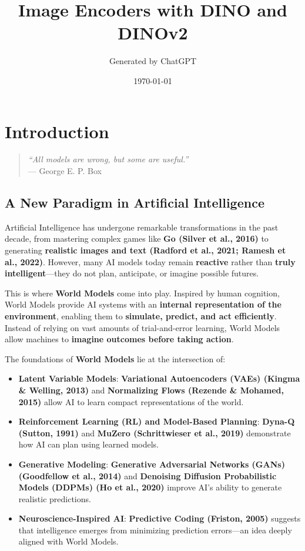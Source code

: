 \documentclass[
]{book}
\title{\textbf{Image Encoders with DINO and DINOv2}}
\author{Generated by ChatGPT}
\date{1970-01-01}
\providecommand{\tightlist}{%
  \setlength{\itemsep}{0pt}\setlength{\parskip}{0pt}}
\begin{document}
\maketitle

{
\setcounter{tocdepth}{1}
\tableofcontents
}
\chapter{Introduction}\label{introduction}

\begin{quote}
\emph{``All models are wrong, but some are useful.''}\\
--- George E. P. Box
\end{quote}

\section{A New Paradigm in Artificial Intelligence}\label{a-new-paradigm-in-artificial-intelligence}

Artificial Intelligence has undergone remarkable transformations in the past decade, from mastering complex games like \textbf{Go (Silver et al., 2016)} to generating \textbf{realistic images and text (Radford et al., 2021; Ramesh et al., 2022)}. However, many AI models today remain \textbf{reactive} rather than \textbf{truly intelligent}---they do not plan, anticipate, or imagine possible futures.

This is where \textbf{World Models} come into play. Inspired by human cognition, World Models provide AI systems with an \textbf{internal representation of the environment}, enabling them to \textbf{simulate, predict, and act efficiently}. Instead of relying on vast amounts of trial-and-error learning, World Models allow machines to \textbf{imagine outcomes before taking action}.

The foundations of \textbf{World Models} lie at the intersection of:

\begin{itemize}
\tightlist
\item
  \textbf{Latent Variable Models}: \textbf{Variational Autoencoders (VAEs) (Kingma \& Welling, 2013)} and \textbf{Normalizing Flows (Rezende \& Mohamed, 2015)} allow AI to learn compact representations of the world.\\
\item
  \textbf{Reinforcement Learning (RL) and Model-Based Planning}: \textbf{Dyna-Q (Sutton, 1991)} and \textbf{MuZero (Schrittwieser et al., 2019)} demonstrate how AI can plan using learned models.\\
\item
  \textbf{Generative Modeling}: \textbf{Generative Adversarial Networks (GANs) (Goodfellow et al., 2014)} and \textbf{Denoising Diffusion Probabilistic Models (DDPMs) (Ho et al., 2020)} improve AI's ability to generate realistic predictions.\\
\item
  \textbf{Neuroscience-Inspired AI}: \textbf{Predictive Coding (Friston, 2005)} suggests that intelligence emerges from minimizing prediction errors---an idea deeply aligned with World Models.
\end{itemize}
\end{document}
